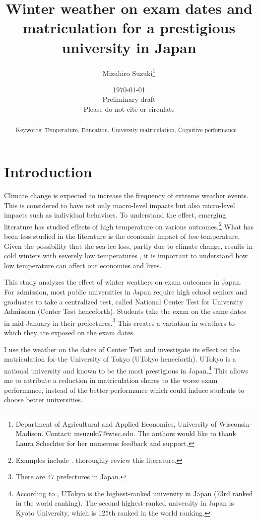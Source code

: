 \documentclass[12pt,letterpaper]{article}
\title{Winter weather on exam dates and matriculation for a prestigious university in Japan}%
\author{Mizuhiro Suzuki\thanks{Department of Agricultural and Applied Economics, University of Wisconsin-Madison. Contact: msuzuki7@wisc.edu. The authors would like to thank Laura Schechter for her numerous feedback and support.}}
\date{\today \\ \vspace{1cm} Preliminary draft \\ Please do not cite or circulate}
\begin{document}
  
\maketitle
\begin{abstract}
  \singlespacing
     \noindent 
  
  \medskip
  \vspace{1cm}
 \noindent Keywords: Temperature, Education, University matriculation, Cognitive performance
\end{abstract}

\newpage

\section{Introduction}

Climate change is expected to increase the frequency of extreme weather events.
This is considered to have not only macro-level impacts but also micro-level impacts such as individual behaviors.
To understand the effect, emerging literature has studied effects of high temperature on various outcomes.\footnote{
  Examples include \citet{Dell2012, Burke2015, Heyes2019, Garg2020, Geruso2018, Park2020a, Park2020b, GraffZivi2018, GraffZivin2014}.
  \citet{Carleton2016} thoroughly review this literature.
}
What has been less studied in the literature is the economic impact of \textit{low} temperature.
Given the possibility that the sea-ice loss, partly due to climate change, results in cold winters with severely low temperatures \citep{Kretschmer2016, Kim2014}, it is important to understand how low temperature can affect our economies and lives.

This study analyzes the effect of winter weathers on exam outcomes in Japan.
For admission, most public universities in Japan require high school seniors and graduates to take a centralized test, called National Center Test for University Admission (Center Test henceforth).
Students take the exam on the same dates in mid-January in their prefectures.\footnote{
  There are 47 prefectures in Japan.
}
This creates a variation in weathers to which they are exposed on the exam dates.

I use the weather on the dates of Center Test and investigate its effect on the matriculation for the University of Tokyo (UTokyo henceforth).
UTokyo is a national university and known to be the most prestigious in Japan.\footnote{
  According to \citet{usnews}, UTokyo is the highest-ranked university in Japan (73rd ranked in the world ranking).
  The second highest-ranked university in Japan is Kyoto University, which is 125th ranked in the world ranking.
}
This allows me to attribute a reduction in matriculation shares to the worse exam performance, instead of the better performance which could induce students to choose better universities.
\end{document}
